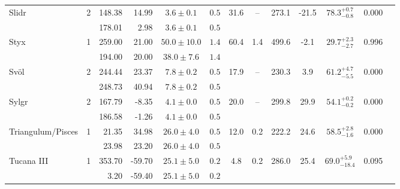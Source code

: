 \begin{tabular}{lcrrccccccccr}
	\multirow{2}{*}{Slidr} & \multirow{2}{*}{2} & 148.38 & 14.99 & $3.6 \pm 0.1$ & $0.5$ & \multirow{2}{*}{31.6} & \multirow{2}{*}{--} & \multirow{2}{*}{273.1} & \multirow{2}{*}{-21.5} & \multirow{2}{*}{$78.3^{+0.7}_{-0.8}$} & \multirow{2}{*}{0.000} & \multirow{2}{*}{\citet{Ibata:2019}} \\
	 &  & 178.01 & 2.98 & $3.6 \pm 0.1$ & $0.5$ &  &  &  &  &  &  &  \\
	\multirow{2}{*}{Styx} & \multirow{2}{*}{1} & 259.00 & 21.00 & $50.0 \pm 10.0$ & $1.4$ & \multirow{2}{*}{60.4} & \multirow{2}{*}{1.4} & \multirow{2}{*}{499.6} & \multirow{2}{*}{-2.1} & \multirow{2}{*}{$29.7^{+2.3}_{-2.7}$} & \multirow{2}{*}{0.996} & \multirow{2}{*}{\citet{Grillmair:2009}} \\
	 &  & 194.00 & 20.00 & $38.0 \pm 7.6$ & $1.4$ &  &  &  &  &  &  &  \\
	\multirow{2}{*}{Sv\"{o}l} & \multirow{2}{*}{2} & 244.44 & 23.37 & $7.8 \pm 0.2$ & $0.5$ & \multirow{2}{*}{17.9} & \multirow{2}{*}{--} & \multirow{2}{*}{230.3} & \multirow{2}{*}{3.9} & \multirow{2}{*}{$61.2^{+4.7}_{-5.5}$} & \multirow{2}{*}{0.000} & \multirow{2}{*}{\citet{Ibata:2019}} \\
	 &  & 248.73 & 40.94 & $7.8 \pm 0.2$ & $0.5$ &  &  &  &  &  &  &  \\
	\multirow{2}{*}{Sylgr} & \multirow{2}{*}{2} & 167.79 & -8.35 & $4.1 \pm 0.0$ & $0.5$ & \multirow{2}{*}{20.0} & \multirow{2}{*}{--} & \multirow{2}{*}{299.8} & \multirow{2}{*}{29.9} & \multirow{2}{*}{$54.1^{+0.2}_{-0.2}$} & \multirow{2}{*}{0.000} & \multirow{2}{*}{\citet{Ibata:2019}} \\
	 &  & 186.58 & -1.26 & $4.1 \pm 0.0$ & $0.5$ &  &  &  &  &  &  &  \\
	\multirow{2}{*}{Triangulum/Pisces} & \multirow{2}{*}{1} & 21.35 & 34.98 & $26.0 \pm 4.0$ & $0.5$ & \multirow{2}{*}{12.0} & \multirow{2}{*}{0.2} & \multirow{2}{*}{222.2} & \multirow{2}{*}{24.6} & \multirow{2}{*}{$58.5^{+2.8}_{-1.6}$} & \multirow{2}{*}{0.000} & \multirow{2}{*}{\citet{Bonaca:2012}} \\
	 &  & 23.98 & 23.20 & $26.0 \pm 4.0$ & $0.5$ &  &  &  &  &  &  &  \\
	\multirow{2}{*}{Tucana III} & \multirow{2}{*}{1} & 353.70 & -59.70 & $25.1 \pm 5.0$ & $0.2$ & \multirow{2}{*}{4.8} & \multirow{2}{*}{0.2} & \multirow{2}{*}{286.0} & \multirow{2}{*}{25.4} & \multirow{2}{*}{$69.0^{+5.9}_{-18.4}$} & \multirow{2}{*}{0.095} & \multirow{2}{*}{\citet{Shipp:2018}} \\
	 &  & 3.20 & -59.40 & $25.1 \pm 5.0$ & $0.2$ &  &  &  &  &  &  &  \\

\end{tabular}
